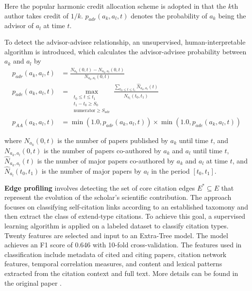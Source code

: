 Here the popular harmonic credit allocation scheme \cite{} is adopted
in that the \(k\)th author takes credit of \( 1/k \). \( p_{adr}(a_k, a_l, t) \) denotes the probability of \( a_k \) being the advisor of  \( a_l \) at time \( t \).

To detect the advisor-advisee relationship, an unsupervised, human-interpretable algorithm is introduced, which calculates the advisor-advisee probability between \( a_k \) and \( a_l \) by
\begin{equation}
\begin{aligned}
p_{adr}(a_k, a_l, t) &= \frac{N_{a_k}(0, t) - N_{a_k, a_l}(0, t)}{N_{a_k, a_l}(0, t)} \\
p_{ade}(a_k, a_l, t) &= \max_{\substack{t_0 \leq t \leq t_1 \\ t_1 - t_0 \geq S_0 \\ \text{numerator} \geq S_{\text{adr}}}} \frac{\sum_{t_0 \leq t \leq t_1} \hat{N}_{a_k, a_l}(t)}{\hat{N}_{a_l}(t_0, t_1)} \\
p_{AA}(a_k, a_l, t) &= \min(1.0, p_{adr}(a_k, a_l, t)) \times \min(1.0, p_{ade}(a_k, a_l, t))
\end{aligned}
\label{eq:relationship}
\end{equation}

where \( N_{a_k}(0, t) \) is the number of papers published by \( a_k \) until time \( t \), and \( N_{a_k, a_l}(0, t) \) is the number of papers co-authored by \( a_k \) and \( a_l \) until time \( t \), \( \hat{N}_{a_k, a_l}(t) \) is the number of major papers co-authored by \( a_k \) and \( a_l \) at time \( t \), and \( \hat{N}_{a_l}(t_0, t_1) \) is the number of major papers by \( a_l \) in the period \([t_0, t_1]\).




\textbf{Edge profiling} involves detecting the set of core citation edges \( E^* \subseteq E \) that represent the evolution of the scholar's scientific contribution. The approach focuses on classifying self-citation links according to an established taxomony and then extract the class of extend-type citations. To achieve this goal, a supervised learning algorithm is applied on a labeled dataset to classify citation types. Twenty features are selected and input to an Extra-Tree model. The model achieves an F1 score of 0.646 with 10-fold cross-validation. The features used in classification include metadata of cited and citing papers, citation network features, temporal correlation measures, and content and lexical patterns extracted from the citation context and full text. More details can be found in the original paper \cite{luo2023impact}.

